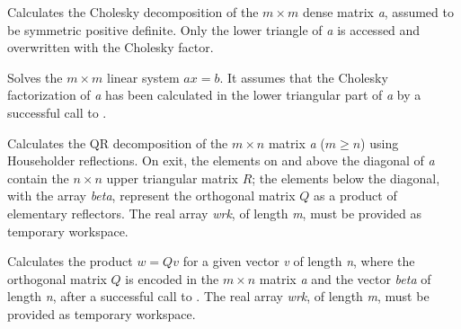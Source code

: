 \documentclass[letterpaper,10pt,english]{sphinxmanual}
\begin{document}

\begin{fulllineitems}
\label{linear_solvers/DLS:densePOTRF}
Calculates the Cholesky decomposition of the $m \times m$
dense matrix \emph{a}, assumed to be symmetric positive definite.  Only
the lower triangle of \emph{a} is accessed and overwritten with the
Cholesky factor.

\end{fulllineitems}


\begin{fulllineitems}
\label{linear_solvers/DLS:densePOTRS}
Solves the $m \times m$ linear system $ax = b$.  It
assumes that the Cholesky factorization of \emph{a} has been calculated
in the lower triangular part of \emph{a} by a successful call to
.

\end{fulllineitems}


\begin{fulllineitems}
\label{linear_solvers/DLS:denseGEQRF}
Calculates the QR decomposition of the $m \times n$ matrix
\emph{a} ($m \ge n$) using Householder reflections.  On exit, the
elements on and above the diagonal of \emph{a} contain the $n
\times n$ upper triangular matrix $R$; the elements below the
diagonal, with the array \emph{beta}, represent the orthogonal matrix
$Q$ as a product of elementary reflectors. The real array
\emph{wrk}, of length \emph{m}, must be provided as temporary workspace.

\end{fulllineitems}


\begin{fulllineitems}
\label{linear_solvers/DLS:denseORMQR}
Calculates the product $w = Qv$ for a given vector \emph{v} of
length \emph{n}, where the orthogonal matrix $Q$ is encoded in the
$m \times n$ matrix \emph{a} and the vector \emph{beta} of length \emph{n},
after a successful call to {\hyperref[linear_solvers/DLS:denseGEQRF]{}}. The real array
\emph{wrk}, of length \emph{m}, must be provided as temporary workspace.

\end{fulllineitems}
\end{document}
